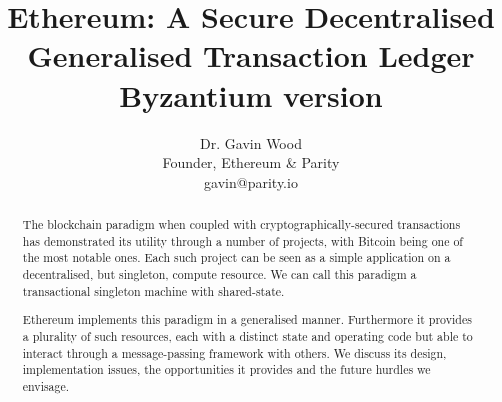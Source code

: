 \documentclass[9pt,oneside]{amsart}
\title{Ethereum: A Secure Decentralised Generalised Transaction Ledger \\ {\smaller \textbf{Byzantium version \YellowPaperVersionNumber}}}
\author{
    Dr. Gavin Wood\\
    Founder, Ethereum \& Parity\\
    gavin@parity.io
}
\begin{document}
\pagecolor{pagecolor}

\begin{abstract}
The blockchain paradigm when coupled with cryptographically-secured transactions has demonstrated its utility through a number of projects, with Bitcoin being one of the most notable ones. Each such project can be seen as a simple application on a decentralised, but singleton, compute resource. We can call this paradigm a transactional singleton machine with shared-state.

Ethereum implements this paradigm in a generalised manner. Furthermore it provides a plurality of such resources, each with a distinct state and operating code but able to interact through a message-passing framework with others. We discuss its design, implementation issues, the opportunities it provides and the future hurdles we envisage.
\end{abstract}

\maketitle
\end{document}
